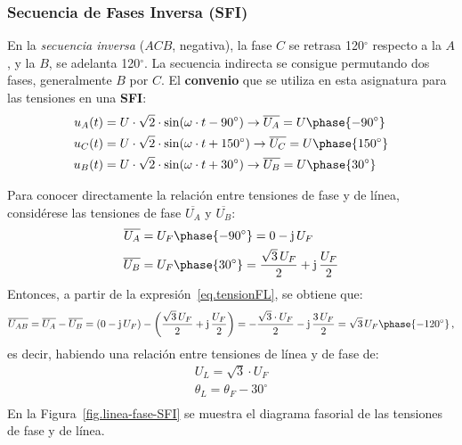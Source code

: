 \documentclass[11pt]{book} %
\begin{document}
	\subsubsection{Secuencia de Fases Inversa (SFI)}
	
	En la \textit{secuencia inversa} ($ACB$, negativa), la fase $C$ se retrasa 120$^\circ$ respecto a la $A$, y la $B$, se adelanta 120$^\circ$. La secuencia indirecta se consigue permutando dos fases, generalmente $B$ por $C$. El \textbf{convenio} que se utiliza en esta asignatura para las tensiones en una \textbf{SFI}:
	\begin{align*}
		u_{A}(t)&=U\cdot\sqrt{2}\cdot \sin(\omega\cdot t-90^\circ)\rightarrow \overline{U_{A}}=U\phase {-90^\circ}\\
		u_{C}(t)&=U\cdot\sqrt{2}\cdot \sin(\omega\cdot t+150^\circ) \rightarrow \overline{U_{C}}=U\phase {150^\circ}\\
		u_{B}(t)&=U\cdot\sqrt{2}\cdot \sin(\omega\cdot t+30^\circ)\rightarrow \overline{U_{B}}=U\phase {30^\circ}
	\end{align*}
	
	Para conocer directamente la relación entre tensiones de fase y de línea, considérese las tensiones de fase $\overline{U_A}$ y $\overline{U_B}$: 
	\begin{align*}
		\overline{U_A} &= U_F\phase{-90^\circ}=0-\mathrm{j}\,U_F
		\\
		\overline{U_B} &= U_F\phase{30^\circ}=\dfrac{\sqrt{3}\,U_F}{2}+\mathrm{j}\,\dfrac{U_F}{2}
	\end{align*}
	Entonces, a partir de la expresión~\eqref{eq.tensionFL}, se obtiene que: 
	\begin{equation*}
		\overline{U_{AB}}=\overline{U_{A}}-\overline{U_{B}}=(0-\mathrm{j}\,U_F)-\left(\dfrac{\sqrt{3}\,U_F}{2}+\mathrm{j}\,\dfrac{U_F}{2}\right)=-\dfrac{\sqrt{3}\cdot U_F}{2}-\mathrm{j}\,\dfrac{3\,U_F}{2}=\sqrt{3}\,U_F \phase{-120^\circ}\,,
	\end{equation*}
	es decir, habiendo una relación entre tensiones de línea y de fase de: 
	\begin{equation}\label{eq.sfi_fase-linea}
		\boxed{
			\begin{array}{l}
				U_L = \sqrt{3}\cdot U_F\\
				\theta_L = \theta_F - 30^\circ\\
			\end{array}
		} 
	\end{equation}
	En la Figura~\ref{fig.linea-fase-SFI} se muestra el diagrama fasorial de las tensiones de fase y de línea. 
\end{document}

